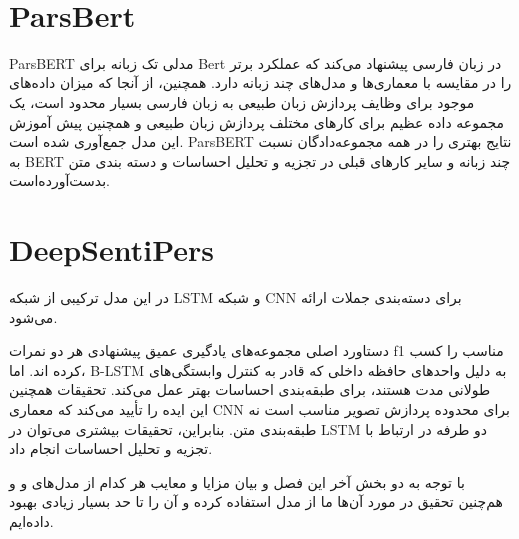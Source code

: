\\

\section{ParsBert}

ParsBERT \cite{Mehrdad2020ParsBERT} 
‌مدلی تک زبانه برای Bert در ‌زبان فارسی پیشنهاد می‌کند که عملکرد برتر را در مقایسه با معماری‌ها و مدل‌های چند زبانه دارد. همچنین، از آنجا که میزان داده‌های موجود برای وظایف پردازش زبان طبیعی به زبان فارسی بسیار محدود است، یک مجموعه داده عظیم برای کارهای مختلف پردازش زبان طبیعی و همچنین پیش آموزش این مدل جمع‌آوری شده است. ParsBERT نتایج بهتری را در همه مجموعه‌دادگان نسبت به BERT چند زبانه و سایر کارهای قبلی در تجزیه و تحلیل احساسات و دسته بندی متن بدست‌آورده‌است.


\section{DeepSentiPers}
در این مدل
\cite{Javad2020DeepSentiPers}
ترکیبی از شبکه 
LSTM 
\cite{Sepp1997LSTM}
\cite{Dimensional}
و 
شبکه
CNN
\cite{lecun1989handwritten}
\cite{lecun2015deep}
برای دسته‌بندی جملات ارائه می‌شود.

دستاورد اصلی مجموعه‌های یادگیری عمیق پیشنهادی هر دو نمرات f1 مناسب را کسب کرده اند.  اما، B-LSTM به دلیل واحدهای حافظه داخلی که قادر به کنترل وابستگی‌های طولانی مدت هستند، برای طبقه‌بندی احساسات بهتر عمل می‌کند.  تحقیقات همچنین این ایده را تأیید می‌کند که معماری CNN برای محدوده پردازش تصویر مناسب است نه طبقه‌بندی متن.  بنابراین، تحقیقات بیشتری می‌توان در LSTM دو طرفه در ارتباط با تجزیه و تحلیل احساسات انجام داد.



با توجه به دو بخش آخر این فصل و بیان مزایا و معایب هر کدام از مدل‌های 
و 
و هم‌چنین تحقیق در مورد آن‌ها ما از مدل 
استفاده کرده و آن را تا حد بسیار زیادی بهبود داده‌ایم.